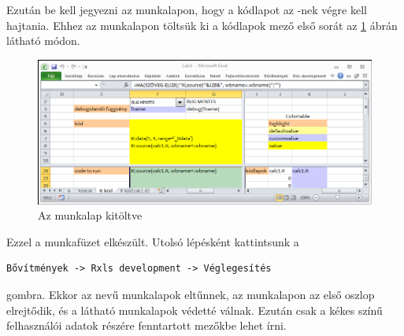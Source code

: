 Ezután be kell jegyezni az  munkalapon, hogy a
 kódlapot az -nek végre 
kell hajtania. Ehhez az  munkalapon töltsük ki a kódlapok
mező első sorát az \ref{fig:1.5} ábrán látható módon.
\begin{figure}[h]
  \centering
  \includegraphics{images/R-kod-filled}
  \caption{Az  munkalap kitöltve}
  \label{fig:1.5}
\end{figure}

Ezzel a  munkafüzet elkészült. Utolsó lépésként kattintsunk a
\begin{verbatim}
Bővítmények -> Rxls development -> Véglegesítés
\end{verbatim}
gombra. Ekkor az  nevű munkalapok eltűnnek, az
 munkalapon az első oszlop 
elrejtődik, és a látható munkalapok védetté válnak. Ezután csak a
kékes színű felhasználói 
adatok részére fenntartott mezőkbe lehet írni.


\endinput

\begin{Rnw}
<<>>=
ls(all=T)
ls(all=T,pos=1)
@
  
\end{Rnw}

